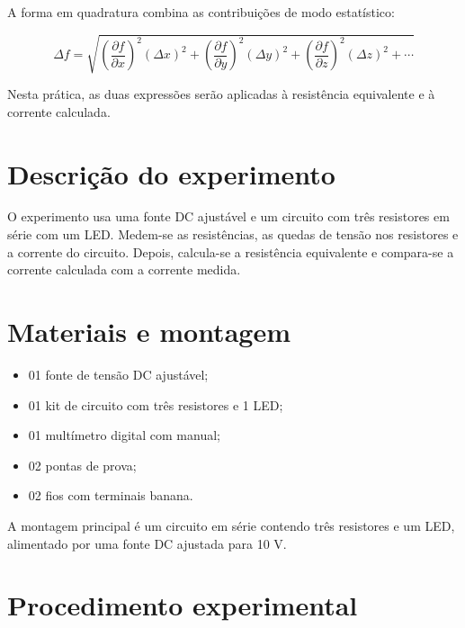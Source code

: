 \documentclass[12pt,a4paper]{article}
\begin{document}
A forma em quadratura combina as contribuições de modo estatístico:

\begin{equation}
\Delta f =
\sqrt{
\left( \frac{\partial f}{\partial x} \right)^2 (\Delta x)^2 +
\left( \frac{\partial f}{\partial y} \right)^2 (\Delta y)^2 +
\left( \frac{\partial f}{\partial z} \right)^2 (\Delta z)^2 + \cdots
}
\end{equation}

Nesta prática, as duas expressões serão aplicadas à resistência equivalente e à corrente calculada.

\section{Descrição do experimento}

O experimento usa uma fonte DC ajustável e um circuito com três resistores em série com um LED. Medem-se as resistências, as quedas
de tensão nos resistores e a corrente do circuito. Depois, calcula-se a resistência equivalente e compara-se a corrente calculada com
a corrente medida.

\section{Materiais e montagem}

\begin{itemize}
  \item 01 fonte de tensão DC ajustável;
  \item 01 kit de circuito com três resistores e 1 LED;
  \item 01 multímetro digital com manual;
  \item 02 pontas de prova;
  \item 02 fios com terminais banana.
\end{itemize}

A montagem principal é um circuito em série contendo três resistores e um LED, alimentado por uma fonte DC ajustada para 10 V.

\section{Procedimento experimental}
\end{document}
